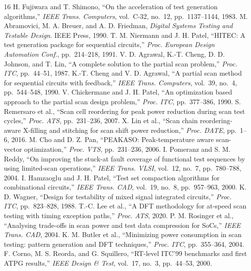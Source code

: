 \documentclass[conference]{IEEEtran}
\begin{document}
\begin{thebibliography}{16}
 H. Fujiwara and T. Shimono, ``On the acceleration of test generation algorithms,'' \emph{IEEE Trans. Computers}, vol.\ C-32, no.\ 12, pp.\ 1137--1144, 1983.
 M. Abramovici, M. A. Breuer, and A. D. Friedman, \emph{Digital Systems Testing and Testable Design}. IEEE Press, 1990.
 T. M. Niermann and J. H. Patel, ``HITEC: A test generation package for sequential circuits,'' \emph{Proc. European Design Automation Conf.}, pp.\ 214--218, 1991.
 V. D. Agrawal, K.-T. Cheng, D. D. Johnson, and T. Lin, ``A complete solution to the partial scan problem,'' \emph{Proc. ITC}, pp.\ 44--51, 1987.
 K.-T. Cheng and V. D. Agrawal, ``A partial scan method for sequential circuits with feedback,'' \emph{IEEE Trans. Computers}, vol.\ 39, no.\ 4, pp.\ 544--548, 1990.
 V. Chickermane and J. H. Patel, ``An optimization based approach to the partial scan design problem,'' \emph{Proc. ITC}, pp.\ 377--386, 1990.
 S. Remersaro et al., ``Scan cell reordering for peak power reduction during scan test cycles,'' \emph{Proc. ATS}, pp.\ 231--236, 2007.
 X. Lin et al., ``Scan chain reordering-aware X-filling and stitching for scan shift power reduction,'' \emph{Proc. DATE}, pp.\ 1--6, 2016.
 M. Cho and D. Z. Pan, ``PEAKASO: Peak-temperature aware scan-vector optimization,'' \emph{Proc. VTS}, pp.\ 231--236, 2006.
 I. Pomeranz and S. M. Reddy, ``On improving the stuck-at fault coverage of functional test sequences by using limited-scan operations,'' \emph{IEEE Trans. VLSI}, vol.\ 12, no.\ 7, pp.\ 780--788, 2004.
 I. Hamzaoglu and J. H. Patel, ``Test set compaction algorithms for combinational circuits,'' \emph{IEEE Trans. CAD}, vol.\ 19, no.\ 8, pp.\ 957--963, 2000.
 K. D. Wagner, ``Design for testability of mixed signal integrated circuits,'' \emph{Proc. ITC}, pp.\ 823--828, 1988.
 T.-C. Lee et al., ``A DFT methodology for at-speed scan testing with timing exception paths,'' \emph{Proc. ATS}, 2020.
 P. M. Rosinger et al., ``Analysing trade-offs in scan power and test data compression for SoCs,'' \emph{IEEE Trans. CAD}, 2004.
 K. M. Butler et al., ``Minimizing power consumption in scan testing: pattern generation and DFT techniques,'' \emph{Proc. ITC}, pp.\ 355--364, 2004.
 F. Corno, M. S. Reorda, and G. Squillero, ``RT-level ITC'99 benchmarks and first ATPG results,'' \emph{IEEE Design \& Test}, vol.\ 17, no.\ 3, pp.\ 44--53, 2000.
\end{thebibliography}
\end{document}
